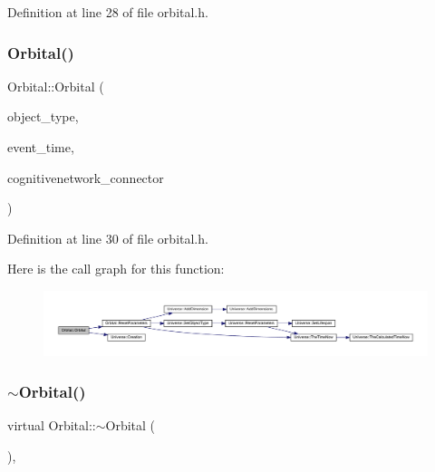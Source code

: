 Definition at line 28 of file orbital.\+h.

\mbox{\label{class_orbital_ac54161437f3bd23cc1e6e85e702239c8}} 
\subsubsection{\texorpdfstring{Orbital()}{Orbital()}\hspace{0.1cm}{\footnotesize\ttfamily [4/4]}}
{\footnotesize\ttfamily Orbital\+::\+Orbital (\begin{DoxyParamCaption}\item[{unsigned int}]{object\+\_\+type,  }\item[{std\+::chrono\+::time\+\_\+point$<$ \hyperlink{universe_8h_a0ef8d951d1ca5ab3cfaf7ab4c7a6fd80}{Clock} $>$}]{event\+\_\+time,  }\item[{\hyperlink{class_cognitive_network}{Cognitive\+Network} \&}]{cognitivenetwork\+\_\+connector }\end{DoxyParamCaption})\hspace{0.3cm}{\ttfamily [inline]}}



Definition at line 30 of file orbital.\+h.

Here is the call graph for this function\+:
\nopagebreak
\begin{figure}[H]
\begin{center}
\leavevmode
\includegraphics[width=350pt]{class_orbital_ac54161437f3bd23cc1e6e85e702239c8_cgraph}
\end{center}
\end{figure}
\mbox{\label{class_orbital_af3c531d6dd6f3951dca836a2a9787c2c}} 
\subsubsection{\texorpdfstring{$\sim$\+Orbital()}{~Orbital()}}
{\footnotesize\ttfamily virtual Orbital\+::$\sim$\+Orbital (\begin{DoxyParamCaption}{ }\end{DoxyParamCaption})\hspace{0.3cm}{\ttfamily [inline]}, {\ttfamily [virtual]}}



